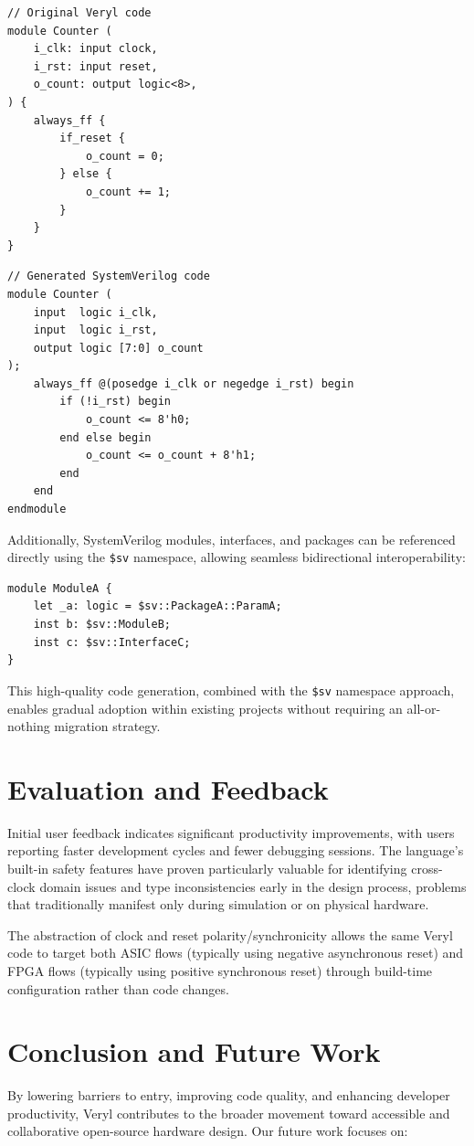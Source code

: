 \documentclass[conference]{IEEEtran}
\begin{document}
\begin{verbatim}
// Original Veryl code
module Counter (
    i_clk: input clock,
    i_rst: input reset,
    o_count: output logic<8>,
) {
    always_ff {
        if_reset {
            o_count = 0;
        } else {
            o_count += 1;
        }
    }
}
\end{verbatim}

\begin{verbatim}
// Generated SystemVerilog code
module Counter (
    input  logic i_clk,
    input  logic i_rst,
    output logic [7:0] o_count
);
    always_ff @(posedge i_clk or negedge i_rst) begin
        if (!i_rst) begin
            o_count <= 8'h0;
        end else begin
            o_count <= o_count + 8'h1;
        end
    end
endmodule
\end{verbatim}

Additionally, SystemVerilog modules, interfaces, and packages can be referenced directly using the \texttt{\$sv} namespace, allowing seamless bidirectional interoperability:

\begin{verbatim}
module ModuleA {
    let _a: logic = $sv::PackageA::ParamA;
    inst b: $sv::ModuleB;
    inst c: $sv::InterfaceC;
}
\end{verbatim} 

This high-quality code generation, combined with the \texttt{\$sv} namespace
approach, enables gradual adoption within existing projects without requiring
an all-or-nothing migration strategy.

\section{Evaluation and Feedback}
Initial user feedback indicates significant productivity improvements, with
users reporting faster development cycles and fewer debugging sessions. The
language's built-in safety features have proven particularly valuable for
identifying cross-clock domain issues and type inconsistencies early in the
design process, problems that traditionally manifest only during simulation or
on physical hardware.

The abstraction of clock and reset polarity/synchronicity allows the same Veryl
code to target both ASIC flows (typically using negative asynchronous reset)
and FPGA flows (typically using positive synchronous reset) through build-time
configuration rather than code changes.

\section{Conclusion and Future Work}
By lowering barriers to entry, improving code quality, and enhancing developer
productivity, Veryl contributes to the broader movement toward accessible and
collaborative open-source hardware design. Our future work focuses on:
\end{document}
